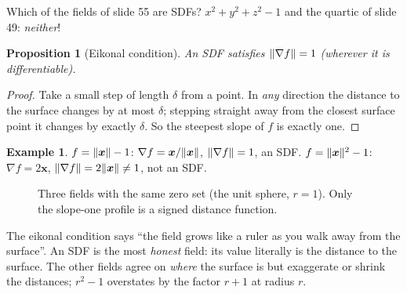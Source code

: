 \documentclass[11pt,a4paper]{article}
\newcommand{\vx}{\bm{x}}
\theoremstyle{definition}
\newtheorem{example}[definition]{Example}
\theoremstyle{plain}
\newtheorem{proposition}[definition]{Proposition}
\theoremstyle{remark}
\begin{document}
Which of the fields of slide 55 are SDFs? $x^2+y^2+z^2-1$ and the quartic of slide 49: \emph{neither}!

\begin{proposition}[Eikonal condition]\label{prop:eikonal}
An SDF satisfies $\lVert \nabla f\rVert=1$ (wherever it is differentiable).
\end{proposition}
\begin{proof}
Take a small step of length $\delta$ from a point. In \emph{any} direction the distance to the surface changes by at most $\delta$; stepping straight away from the closest surface point it changes by exactly $\delta$. So the steepest slope of $f$ is exactly one.
\end{proof}

\begin{example}
$f=\norm{\vx}-1$: $\nabla f=\vx/\norm{\vx}$, $\lVert \nabla f\rVert=1$, an SDF. $f=\norm{\vx}^2-1$: $\nabla f=2\vx$, $\norm{\nabla f}=2\norm{\vx}\ne1$, not an SDF.
\end{example}

\begin{figure}[ht]
\centering
{}
\caption{Three fields with the same zero set (the unit sphere, $r=1$). Only the slope-one profile is a signed distance function.}
\end{figure}

\begin{intuition}
The eikonal condition says ``the field grows like a ruler as you walk away from the surface''. An SDF is the most \emph{honest} field: its value literally is the distance to the surface. The other fields agree on \emph{where} the surface is but exaggerate or shrink the distances; $r^2-1$ overstates by the factor $r+1$ at radius $r$.
\end{intuition}
\end{document}
